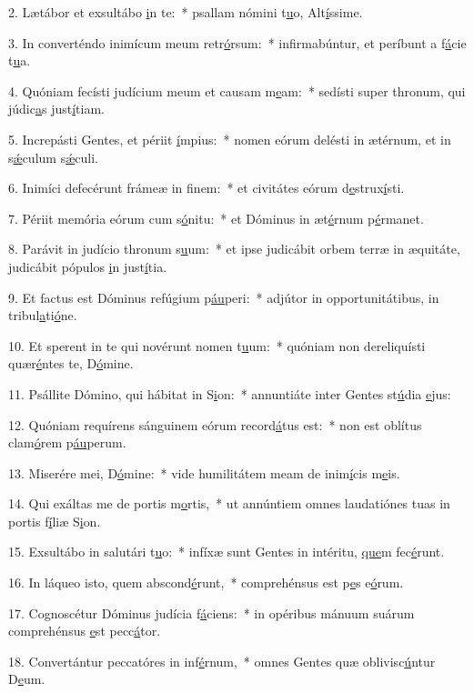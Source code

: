 2. Lætábor et exsultábo \uline{i}n te:~* psallam nómini t\uline{u}o, Alt\uline{í}ssime.\par 
3. In converténdo inimícum meum retr\uline{ó}rsum:~* infirmabúntur, et períbunt a f\uline{á}cie t\uline{u}a.\par 
4. Quóniam fecísti judícium meum et causam m\uline{e}am:~* sedísti super thronum, qui júdic\uline{a}s just\uline{í}tiam.\par 
5. Increpásti Gentes, et périit \uline{í}mpius:~* nomen eórum delésti in ætérnum, et in s\uline{ǽ}culum s\uline{ǽ}culi.\par 
6. Inimíci defecérunt frámeæ in f\uline{i}nem:~* et civitátes eórum d\uline{e}strux\uline{í}sti.\par 
7. Périit memória eórum cum s\uline{ó}nitu:~* et Dóminus in æt\uline{é}rnum p\uline{é}rmanet.\par 
8. Parávit in judício thronum s\uline{u}um:~* et ipse judicábit orbem terræ in æquitáte, judicábit pópulos \uline{i}n just\uline{í}tia.\par 
9. Et factus est Dóminus refúgium p\uline{áu}peri:~* adjútor in opportunitátibus, in tribul\uline{a}ti\uline{ó}ne.\par 
10. Et sperent in te qui novérunt nomen t\uline{u}um:~* quóniam non dereliquísti quær\uline{é}ntes te, D\uline{ó}mine.\par 
11. Psállite Dómino, qui hábitat in S\uline{i}on:~* annuntiáte inter Gentes st\uline{ú}dia \uline{e}jus:\par 
12. Quóniam requírens sánguinem eórum record\uline{á}tus est:~* non est oblítus clam\uline{ó}rem p\uline{áu}perum.\par 
13. Miserére mei, D\uline{ó}mine:~* vide humilitátem meam de inim\uline{í}cis m\uline{e}is.\par 
14. Qui exáltas me de portis m\uline{o}rtis,~* ut annúntiem omnes laudatiónes tuas in portis f\uline{í}liæ S\uline{i}on.\par 
15. Exsultábo in salutári t\uline{u}o:~* infíxæ sunt Gentes in intéritu, \uline{que}m fec\uline{é}runt.\par 
16. In láqueo isto, quem abscond\uline{é}runt,~* comprehénsus est p\uline{e}s e\uline{ó}rum.\par 
17. Cognoscétur Dóminus judícia f\uline{á}ciens:~* in opéribus mánuum suárum comprehénsus \uline{e}st pecc\uline{á}tor.\par 
18. Convertántur peccatóres in inf\uline{é}rnum,~* omnes Gentes quæ oblivisc\uline{ú}ntur D\uline{e}um.\par 
